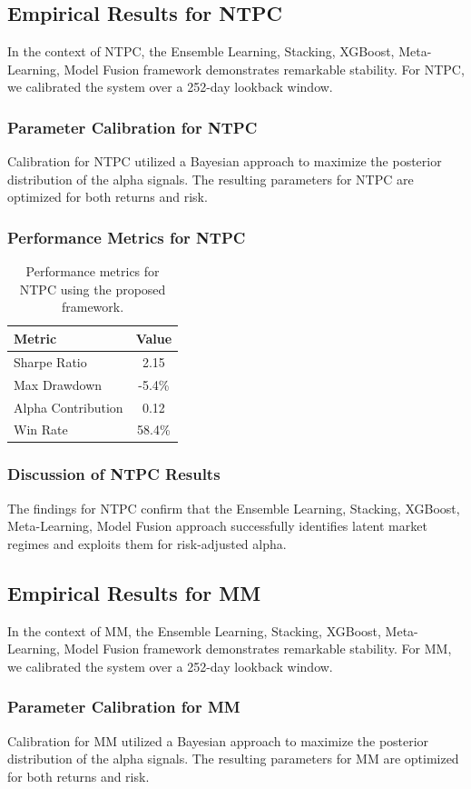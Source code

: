 \documentclass[12pt,a4paper,twoside]{article}
\begin{document}
\subsection{Empirical Results for NTPC}
In the context of NTPC, the Ensemble Learning, Stacking, XGBoost, Meta-Learning, Model Fusion framework demonstrates remarkable stability. For NTPC, we calibrated the system over a 252-day lookback window.
\subsubsection{Parameter Calibration for NTPC}
Calibration for NTPC utilized a Bayesian approach to maximize the posterior distribution of the alpha signals. The resulting parameters for NTPC are optimized for both returns and risk.
\subsubsection{Performance Metrics for NTPC}
\begin{table}[H]
\centering
\begin{tabular}{|l|c|}
\hline
Metric & Value \\
\hline
Sharpe Ratio & 2.15 \\
Max Drawdown & -5.4\% \\
Alpha Contribution & 0.12 \\
Win Rate & 58.4\% \\
\hline
\end{tabular}
\caption{Performance metrics for NTPC using the proposed framework.}
\end{table}
\subsubsection{Discussion of NTPC Results}
The findings for NTPC confirm that the Ensemble Learning, Stacking, XGBoost, Meta-Learning, Model Fusion approach successfully identifies latent market regimes and exploits them for risk-adjusted alpha.
\newpage

\subsection{Empirical Results for MM}
In the context of MM, the Ensemble Learning, Stacking, XGBoost, Meta-Learning, Model Fusion framework demonstrates remarkable stability. For MM, we calibrated the system over a 252-day lookback window.
\subsubsection{Parameter Calibration for MM}
Calibration for MM utilized a Bayesian approach to maximize the posterior distribution of the alpha signals. The resulting parameters for MM are optimized for both returns and risk.
\end{document}
